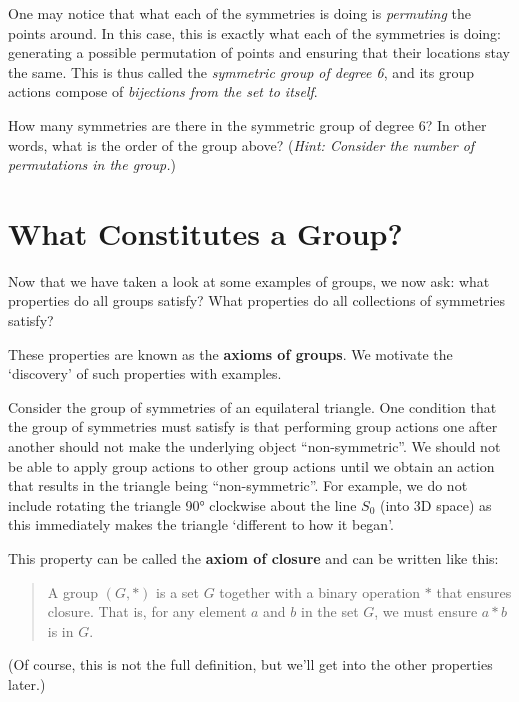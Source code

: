 One may notice that what each of the symmetries is doing is \textit{permuting} the points around. In this case, this is exactly what each of the symmetries is doing: generating a possible permutation of points and ensuring that their locations stay the same. This is thus called the \textit{symmetric group of degree 6}, and its group actions compose of \textit{bijections from the set to itself}.

\begin{exercise}
    How many symmetries are there in the symmetric group of degree 6? In other words, what is the order of the group above? (\textit{Hint: Consider the number of permutations in the group.})
\end{exercise}

\section{What Constitutes a Group?}
Now that we have taken a look at some examples of groups, we now ask: what properties do all groups satisfy? What properties do all collections of symmetries satisfy?

These properties are known as the \textbf{axioms of groups}. We motivate the `discovery’ of such properties with examples.

\begin{figure}
    \centering
\end{figure}

Consider the group of symmetries of an equilateral triangle. One condition that the group of symmetries must satisfy is that performing group actions one after another should not make the underlying object ``non-symmetric''. We should not be able to apply group actions to other group actions until we obtain an action that results in the triangle being ``non-symmetric''. For example, we do not include rotating the triangle 90° clockwise about the line $S_0$ (into 3D space) as this immediately makes the triangle `different to how it began'.

This property can be called the \textbf{axiom of closure} and can be written like this:
\begin{quote}
    A group $(G, \ast)$ is a set $G$ together with a binary operation $\ast$ that ensures closure. That is, for any element $a$ and $b$ in the set $G$, we must ensure $a \ast b$ is in $G$.
\end{quote}
(Of course, this is not the full definition, but we'll get into the other properties later.)

